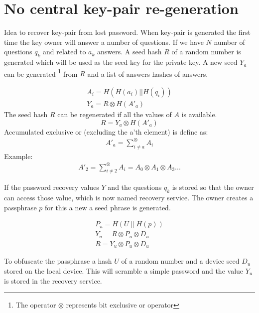 \section{No central key-pair re-generation}

Idea to recover key-pair from lost password.
When key-pair is generated the first time the key owner will answer a number of questions. If we have $N$ number of questions $q_k$ and related to $a_k$  answers.
A seed hash $R$ of a random number is generated which will be used as the seed key for the private key.
A new seed $Y_a$ can be generated \footnote{The operator $\otimes$ represents bit exclusive or operator} from $R$ and a list of answers hashes of answers.



\begin{align}
 A_i = H(H(a_i)||H(q_i)) \\
 Y_a = R \otimes H( A'_a )
 \end{align}
The seed hash $R$ can be regenerated if all the values of $A$ is available.
\begin{equation}
R = Y_a \otimes H( A'_a )
\end{equation}
Accumulated exclusive or (excluding the a'th element) is define as: 
\begin{align}
A'_a = \sum^{\otimes}_{i \neq a}{A_i} 
\end{align}
Example:
\begin{align}
A'_2 = \sum^{\otimes}_{i \neq 2}{A_i} = A_0 \otimes A_1 \otimes A_3 ... 
\end{align}



If the password recovery values $Y$ and the questions $q_k$ is stored so that the owner can access those value, which is now named recovery service.
The owner creates a passphrase $p$ for this a new a seed phrase is generated.

 \begin{align}
   P_u = H(U \parallel H(p)) \\
   Y_u = R \otimes P_u \otimes D_u \\
   R = Y_u \otimes P_u \otimes D_u
 \end{align}

To obfuscate the passphrase a hash $U$ of a random number and a device seed $D_u$ stored on the local device. This will scramble a simple password and the value $Y_u$ is stored in the recovery service.

